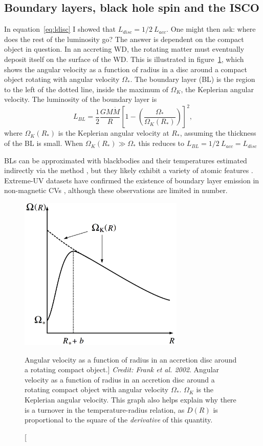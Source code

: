 \subsection{Boundary layers, black hole spin and the ISCO}

In equation~\ref{eq:ldisc} I showed that $L_{disc} = 1/2~L_{acc}$. 
One might then ask: where does the rest of the luminosity go?
The answer is dependent on the compact object in question. 
In an accreting WD, the rotating matter must eventually deposit itself 
on the surface of the WD. This is illustrated in figure~\ref{fig:omega},
which shows the angular velocity as a function of radius in a disc around
a compact object rotating with angular velocity $\Omega_*$. The boundary layer (BL)
is the region to the left of the dotted line, inside the maximum of $\Omega_K$, the Keplerian
angular velocity. The luminosity of the boundary layer is \citep{fkrbook}
\begin{equation}
L_{BL} = \frac{1}{2}\frac{GM \dot{M}}{R} \left[1 - \left(\frac{\Omega_*}{\Omega_K(R_*)}\right)\right]^2,
\end{equation}
where $\Omega_K(R_*)$ is the Keplerian angular velocity at $R_*$, assuming the thickness
of the BL is small. When $\Omega_K(R_*) \gg {\Omega_*}$ this reduces to 
$L_{BL} = 1/2~L_{acc} = L_{disc}$

BLs can be approximated with blackbodies and their temperatures estimated
indirectly via the \cite{zanstra1929} method \cite[e.g.][]{hoare1991,hoaredrew1993}, 
but they likely exhibit a variety of atomic features \citep{suleimanov2014}.
Extreme-UV datasets have confirmed the existence of boundary layer emission
in non-magnetic CVs \citep{mauche1996}, although these observations
are limited in number.

\begin{figure}
\centering
\includegraphics[width=0.7\textwidth]{figures/01-intro/omega.png}
\caption
[Angular velocity as a function of radius in an accretion disc around a rotating
compact object.]
{
{\sl Credit: Frank et al. 2002}.
Angular velocity as a function of radius in an accretion disc around a rotating
compact object with angular velocity $\Omega_*$. $\Omega_K$ is the Keplerian 
angular velocity. This graph
also helps explain why there is a turnover in the temperature-radius relation,
as $D(R)$ is proportional to the square of the {\em derivative} of this quantity.
} 
\label{fig:omega}
\end{figure}

